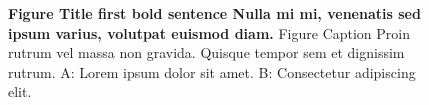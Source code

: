 \documentclass[10pt,letterpaper]{article}
\newcommand{\vcps}{\textsc{vcps}}
\newcommand{\sparql}{\textsc{s}par\textsc{ql}}
\newcommand{\wwwc}{\textsc{w3c}}
\newcommand{\skos}{\textsc{skos}}
\newcommand{\uri}{\textsc{uri}}
\newcommand{\urll}{\textsc{url}}
\newcommand{\http}{\textsc{http}}
\newcommand{\pubby}{\textsc{p}ubby}
\newcommand{\rdf}{\textsc{rdf}}
\newcommand{\ontop}{\textsc{o}n\textsc{t}op}
\newcommand{\quest}{\textsc{q}uest}
\newcommand{\pnud}{\textsc{undp}}
\newcommand{\onu}{\textsc{un}}
\newcommand{\vbs}{\textsc{vbs}}
\newcommand{\serpro}{\textsc{s}erpro}
\newcommand{\python}{\textsc{p}ython}
\begin{document}








\begin{figure}[h]
\caption{{\bf Figure Title first bold sentence Nulla mi mi, venenatis sed ipsum varius, volutpat euismod diam.}
Figure Caption Proin rutrum vel massa non gravida. Quisque tempor sem et dignissim rutrum. A: Lorem ipsum dolor sit amet. B: Consectetur adipiscing elit.}
\label{fig1}
\end{figure}
\end{document}

